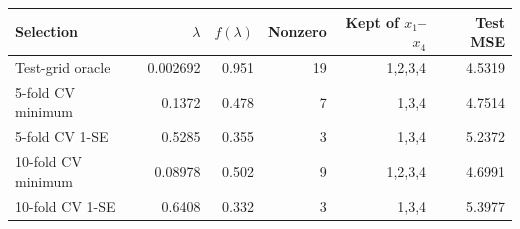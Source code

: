 \begin{center}
\small
\setlength{\tabcolsep}{4pt}
\begin{tabular}{lrrrrr}
\toprule
Selection & $\lambda$ & $f(\lambda)$ & Nonzero & Kept of $x_1$--$x_4$ & Test MSE \\
\midrule
Test-grid oracle & 0.002692 & 0.951 & 19 & 1,2,3,4 & 4.5319 \\
5-fold CV minimum & 0.1372 & 0.478 & 7 & 1,3,4 & 4.7514 \\
5-fold CV 1-SE & 0.5285 & 0.355 & 3 & 1,3,4 & 5.2372 \\
10-fold CV minimum & 0.08978 & 0.502 & 9 & 1,2,3,4 & 4.6991 \\
10-fold CV 1-SE & 0.6408 & 0.332 & 3 & 1,3,4 & 5.3977 \\
\bottomrule
\end{tabular}
\end{center}
